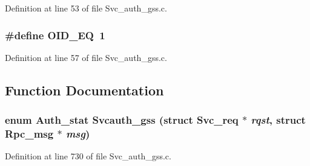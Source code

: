 Definition at line 53 of file Svc\_\-auth\_\-gss.c.
\subsubsection{\setlength{\rightskip}{0pt plus 5cm}\#define OID\_\-EQ\ 1}\label{Svc__auth__gss_8c_a1}




Definition at line 57 of file Svc\_\-auth\_\-gss.c.

\subsection{Function Documentation}
\subsubsection{\setlength{\rightskip}{0pt plus 5cm}enum Auth\_\-stat Svcauth\_\-gss (struct Svc\_\-req $\ast$ {\em rqst}, struct Rpc\_\-msg $\ast$ {\em msg})}\label{Svc__auth__gss_8c_a2}




Definition at line 730 of file Svc\_\-auth\_\-gss.c.